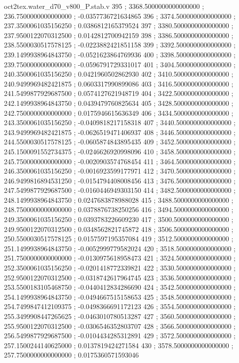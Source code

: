 \begin{filecontents}[overwrite]{oct2tex.water_d70_v800_P.stab.v}
395 ; 3368.5000000000000000 ; 236.7500000000000000 ; -0.0357736721634865
396 ; 3374.5000000000000000 ; 237.3500061035156250 ; 0.0386812165379524
397 ; 3380.5000000000000000 ; 237.9500122070312500 ; 0.0142812700942159
398 ; 3386.5000000000000000 ; 238.5500030517578125 ; -0.0223882421851158
399 ; 3392.5000000000000000 ; 239.1499938964843750 ; -0.0521623864769936
400 ; 3398.5000000000000000 ; 239.7500000000000000 ; -0.0596791729331017
401 ; 3404.5000000000000000 ; 240.3500061035156250 ; 0.0421960502862930
402 ; 3410.5000000000000000 ; 240.9499969482421875 ; 0.0603317990899086
403 ; 3416.5000000000000000 ; 241.5499877929687500 ; 0.0574127621948719
404 ; 3422.5000000000000000 ; 242.1499938964843750 ; 0.0439479760825634
405 ; 3428.5000000000000000 ; 242.7500000000000000 ; 0.0175946615636349
406 ; 3434.5000000000000000 ; 243.3500061035156250 ; -0.0409818217158318
407 ; 3440.5000000000000000 ; 243.9499969482421875 ; -0.0626519471406937
408 ; 3446.5000000000000000 ; 244.5500030517578125 ; -0.0605874843895435
409 ; 3452.5000000000000000 ; 245.1500091552734375 ; -0.0246626920998096
410 ; 3458.5000000000000000 ; 245.7500000000000000 ; -0.0020903574768454
411 ; 3464.5000000000000000 ; 246.3500061035156250 ; -0.0016923599177971
412 ; 3470.5000000000000000 ; 246.9499816894531250 ; -0.0154794408008456
413 ; 3476.5000000000000000 ; 247.5499877929687500 ; -0.0160446949303150
414 ; 3482.5000000000000000 ; 248.1499938964843750 ; 0.0247683878988028
415 ; 3488.5000000000000000 ; 248.7500000000000000 ; 0.0378876738250256
416 ; 3494.5000000000000000 ; 249.3500061035156250 ; 0.0393783226609230
417 ; 3500.5000000000000000 ; 249.9500122070312500 ; 0.0348562821745872
418 ; 3506.5000000000000000 ; 250.5500030517578125 ; 0.0157597195357084
419 ; 3512.5000000000000000 ; 251.1499938964843750 ; -0.0052999779582024
420 ; 3518.5000000000000000 ; 251.7500000000000000 ; -0.0130975618958473
421 ; 3524.5000000000000000 ; 252.3500061035156250 ; -0.0201418772339821
422 ; 3530.5000000000000000 ; 252.9500122070312500 ; -0.0318742617964745
423 ; 3536.5000000000000000 ; 253.5500183105468750 ; -0.0440412834286690
424 ; 3542.5000000000000000 ; 254.1499938964843750 ; -0.0494667515158653
425 ; 3548.5000000000000000 ; 254.7499847412109375 ; -0.0498366691172123
426 ; 3554.5000000000000000 ; 255.3499908447265625 ; -0.0463010780513287
427 ; 3560.5000000000000000 ; 255.9500122070312500 ; -0.0306546352803707
428 ; 3566.5000000000000000 ; 256.5499877929687500 ; -0.0104434285312891
429 ; 3572.5000000000000000 ; 257.1500244140625000 ; 0.0137819424271584
430 ; 3578.5000000000000000 ; 257.7500000000000000 ; 0.0175360571593046

\end{filecontents}
